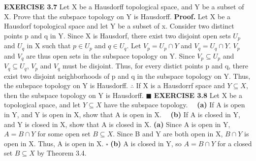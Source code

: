 \documentclass[12pt]{article}
\begin{document}
  \newpage
  \noindent
  \textbf{EXERCISE 3.7} Let X be a Hausdorff topological space, and Y be a subset of X. Prove that the subspace topology on Y is Hausdorff.
  \newline \newline
  \textbf{Proof.} \newline
  Let X be a Hausdorf topological space and let Y be a subset of x.
  \newline
  Consider two distinct points p and q in Y.
  \newline
  Since X is Hausdorf, there exist two disjoint open sets \(U_p\) and \(U_q\) in X such that \(p \in U_p\) and \(q \in U_q\). \newline \newline
  Let \(V_p = U_p \cap Y\) and \(V_q = U_q \cap Y\).
  \newline
  \(V_p\) and \(V_q\) are thus open sets in the subspace topology on Y.
  \newline
  Since \(V_p \subseteq U_p\) and \(V_q \subseteq U_q\), \(V_p\) and \(V_q\) must be disjoint.
  \newline \newline
  Thus, for every distict points p and q, there exist two disjoint neighborhoods of p and q in the subspace topology on Y.
  \newline
  Thus, the subspace topology on Y is Hausdorff.
  \newline \newline
  \(\therefore\) If X is a Hausdorrf space and \(Y \subseteq X\), then the subspace topology on Y is Hausdorff.
  \newline \(\blacksquare\)
  \newpage
  \noindent
  \textbf{EXERCISE 3.8}
  Let X be a topological space, and let \(Y \subseteq X\) have the subspace topology.
  \newline
  \ \ \textbf{(a)} If A is open in Y, and Y is open in X, show that A is open in X.
  \newline
  \ \ \textbf{(b)} If A is closed in Y, and Y is closed in X, show that A is closed in X.
  \newline \newline
  \textbf{(a)} Since A is open in Y, \(A = B \cap Y\) for some open set \(B \subseteq X\).
  \newline
  Since B and Y are both open in X, \(B \cap Y\) is open in X.
  \newline
  Thus, A is open in X.
  \newline \(\square\) \newline
  \textbf{(b)} A is closed in Y, so \(A = B \cap Y\) for a closed set \(B \subseteq X\) by Theorem 3.4.
\end{document}
